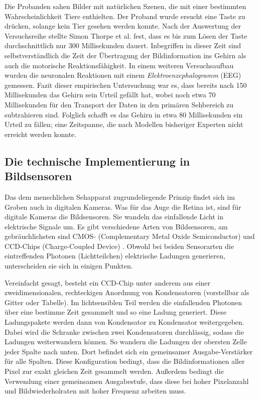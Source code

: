 \documentclass[12pt,a4paper]{article}
\newcommand{\fwex}[1]{\textit{#1}}
\newcommand{\Se}[1]{S. #1}
\begin{document}
Die Probanden sahen Bilder mit natürlichen Szenen, die mit einer bestimmten
Wahrscheinlichkeit Tiere enthielten. Der Proband wurde ersucht eine Taste
zu drücken, solange kein Tier gesehen werden konnte. Nach der Auswertung
der Versuchsreihe stellte Simon Thorpe et al. fest, dass es bis zum Lösen
der Taste durchschnittlich nur 300 Millisekunden dauert. Inbegriffen in
dieser Zeit sind selbstverständlich die Zeit der Übertragung der
Bildinformation ins Gehirn als auch die motorische Reaktionsfähigkeit.
In einem weiteren Versuchsaufbau wurden die neuronalen Reaktionen mit einem
\fwex{Elektroenzephalogramm} (EEG) gemessen. Fazit dieser empirischen
Untersuchung war es, dass bereits nach 150 Millisekunden das Gehirn sein
Urteil gefällt hat, wobei noch etwa 70 Millisekunden für den Transport
der Daten in den primären Sehbereich zu subtrahieren sind. Folglich
schafft es das Gehirn in etwa 80 Millisekunden ein Urteil zu fällen;
eine Zeitspanne, die nach Modellen bisheriger Experten nicht erreicht
werden konnte.

\subsection{Die technische Implementierung in Bildsensoren}

Das dem menschlichen Sehapparat zugrundeliegende Prinzip findet sich im Groben
auch in digitalen Kameras. Was für das Auge die Retina ist, sind für digitale
Kameras die Bildsensoren. Sie wandeln das einfallende Licht in elektrische
Signale um.
Es gibt verschiedene Arten von Bildsensoren, am gebräuchlichsten sind CMOS-
(Complementary Metal Oxide Semiconductor) und CCD-Chips (Charge-Coupled
Device) \cite{photo}. Obwohl bei beiden Sensorarten die eintreffenden
Photonen (Lichtteilchen) elektrische Ladungen generieren, unterscheiden
sie sich in einigen Punkten.

Vereinfacht gesagt, besteht ein CCD-Chip \cite[\Se{1}]{photo} unter anderem
aus einer zweidimensionalen, rechteckigen Anordnung von Kondensatoren
(vorstellbar als Gitter oder Tabelle). Im lichtsensiblen Teil werden die
einfallenden Photonen über eine bestimme Zeit gesammelt und so eine Ladung
generiert. Diese Ladungspakete werden dann von Kondensator zu Kondensator
weitergegeben. Dabei wird die Schranke zwischen zwei Kondensatoren
durchlässig, sodass die Ladungen weiterwandern können. So wandern die
Ladungen der obersten Zelle jeder Spalte nach unten. Dort befindet sich ein
gemeinsamer Ausgabe-Verstärker für alle Spalten.
Diese Konfiguration bedingt, dass die Bildinformationen aller Pixel zur exakt
gleichen Zeit gesammelt werden. Außerdem bedingt die Verwendung einer
gemeinsamen Ausgabestufe, dass diese bei hoher Pixelanzahl und
Bildwiederholraten mit hoher Frequenz arbeiten muss.
\end{document}
